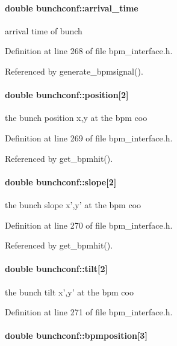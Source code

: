 \paragraph[arrival\_\-time]{\setlength{\rightskip}{0pt plus 5cm}double {\bf bunchconf::arrival\_\-time}}\hfill\label{structbunchconf_e2cb9e35f4ee18761393b29ef6e0de9a}


arrival time of bunch 

Definition at line 268 of file bpm\_\-interface.h.

Referenced by generate\_\-bpmsignal().
\paragraph[position]{\setlength{\rightskip}{0pt plus 5cm}double {\bf bunchconf::position}[2]}\hfill\label{structbunchconf_d2f81b99a529249ff6cfdb85886d3f07}


the bunch position x,y at the bpm coo 

Definition at line 269 of file bpm\_\-interface.h.

Referenced by get\_\-bpmhit().
\paragraph[slope]{\setlength{\rightskip}{0pt plus 5cm}double {\bf bunchconf::slope}[2]}\hfill\label{structbunchconf_867a15a56a3a60db2360b8645756cb71}


the bunch slope x',y' at the bpm coo 

Definition at line 270 of file bpm\_\-interface.h.

Referenced by get\_\-bpmhit().
\paragraph[tilt]{\setlength{\rightskip}{0pt plus 5cm}double {\bf bunchconf::tilt}[2]}\hfill\label{structbunchconf_ed8955a77ae6a4147f4877dfd413c4b7}


the bunch tilt x',y' at the bpm coo 

Definition at line 271 of file bpm\_\-interface.h.
\paragraph[bpmposition]{\setlength{\rightskip}{0pt plus 5cm}double {\bf bunchconf::bpmposition}[3]}\hfill\label{structbunchconf_09345bb14a68c2391548054aa3cc5143}


